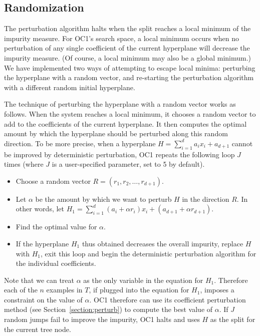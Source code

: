 \subsection{Randomization}
\label{section:rand}
The perturbation algorithm halts when the split reaches a local
minimum of the impurity measure.  For OC1's search space, a local
minimum occurs when no perturbation of any single coefficient of the
current hyperplane will decrease the impurity measure.  (Of course, a
local minimum may also be a global minimum.)  We have implemented two
ways of attempting to escape local minima: perturbing the hyperplane
with a random vector, and re-starting the perturbation algorithm with
a different random initial hyperplane.

The technique of perturbing the hyperplane with a random vector works
as follows.  When the system reaches a local minimum, it chooses a
random vector to add to the coefficients of the current hyperplane.
It then computes the optimal amount by which the hyperplane should be
perturbed along this random direction.  To be more precise, when a
hyperplane \(H = \sum_{i=1}^{d} a_i x_i + a_{d+1} \) cannot be
improved by deterministic perturbation, OC1 repeats the following loop
$J$ times (where $J$ is a user-specified parameter, set to 5 by
default).
\begin{itemize}
\itemsep 0.0in
\item Choose a random vector $R = (r_1,r_2,\ldots,r_{d+1})$.
\item Let $\alpha$ be the amount by which we want to perturb $H$ in the
direction $R$.  In other words, let
\(H_1 = \sum_{i=1}^{d} {(a_i + \alpha r_i) x_i} + (a_{d+1} + 
    \alpha r_{d+1}) \).
\item Find the optimal value for $\alpha$.
\item If the hyperplane $H_1$ thus obtained decreases the overall impurity, 
replace $H$ with $H_1$, exit this loop and begin the deterministic
perturbation algorithm for the individual coefficients.
\end{itemize}
Note that we can treat $\alpha$ as the only variable in the equation
for $H_1$.  Therefore each of the $n$ examples in $T$, if plugged into
the equation for $H_1$, imposes a constraint on the value of $\alpha$.
OC1 therefore can use its coefficient perturbation method (see
Section~\ref{section:perturb}) to compute the best value of $\alpha$.
If $J$ random jumps fail to improve the impurity, OC1 halts and uses
$H$ as the split for the current tree node.

